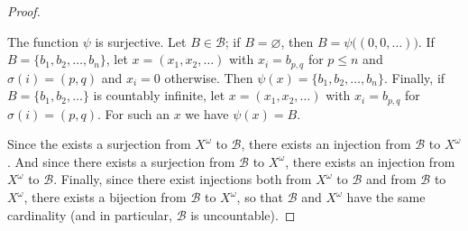 \documentclass[11pt,a4paper,twoside]{article}
\theoremstyle{definition}
\begin{document}
\begin{proof}
\begin{itemize}
  \end{itemize}
  The function $\psi$ is surjective. Let $B \in \mathscr{B}$; if $B = \varnothing$, then $B = \psi \big( (0, 0, \dotsc) \big)$.
  If $B = \{ b_1, b_2, \dotsc, b_n \}$, let $x = (x_1, x_2, \dotsc)$ with $x_i = b_{p, q}$ for $p \leq n$ and $\sigma (i) = (p, q)$ and $x_i = 0$ otherwise.
  Then $\psi (x) = \{ b_1, b_2, \dotsc, b_n \}$. Finally, if $B = \{ b_1, b_2, \dotsc \}$ is countably infinite, let $x = (x_1, x_2, \dotsc)$ with $x_i = b_{p, q}$
  for $\sigma (i) = (p, q)$. For such an $x$ we have $\psi (x) = B$.

  Since the exists a surjection from $X^\omega$ to $\mathscr{B}$, there exists an injection from $\mathscr{B}$ to $X^\omega$.
  And since there exists a surjection from $\mathscr{B}$ to $X^\omega$, there exists an injection from $X^\omega$ to $\mathscr{B}$.
  Finally, since there exist injections both from $X^\omega$ to $\mathscr{B}$ and from $\mathscr{B}$ to $X^\omega$, there exists a bijection
  from $\mathscr{B}$ to $X^\omega$, so that $\mathscr{B}$ and $X^\omega$ have the same cardinality (and in particular, $\mathscr{B}$ is uncountable).

\end{proof}
\end{document}

